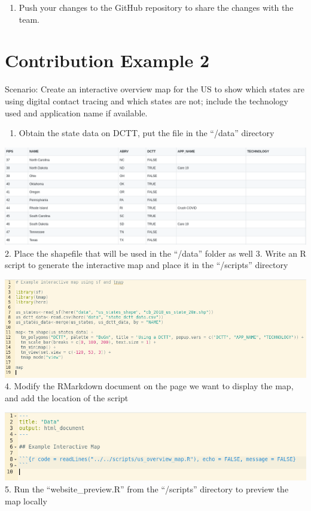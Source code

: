 \documentclass[
]{book}
\providecommand{\tightlist}{%
  \setlength{\itemsep}{0pt}\setlength{\parskip}{0pt}}
\begin{document}
\begin{enumerate}
\def\labelenumi{\arabic{enumi}.}
\setcounter{enumi}{6}
\tightlist
\item
  Push your changes to the GitHub repository to share the changes with the team.
\end{enumerate}

\hypertarget{contribution-example-2}{%
\section{Contribution Example 2}\label{contribution-example-2}}

Scenario: Create an interactive overview map for the US to show which states are using digital contact tracing and which states are not; include the technology used and application name if available.

\begin{enumerate}
\def\labelenumi{\arabic{enumi}.}
\tightlist
\item
  Obtain the state data on DCTT, put the file in the ``/data'' directory
\end{enumerate}

\includegraphics{images/04-example2_1.png}
2. Place the shapefile that will be used in the ``/data'' folder as well
3. Write an R script to generate the interactive map and place it in the ``/scripts'' directory

\includegraphics{images/04-example2_2.png}
4. Modify the RMarkdown document on the page we want to display the map, and add the location of the script

\includegraphics{images/04-example2_3.png}
5. Run the ``website\_preview.R'' from the ``/scripts'' directory to preview the map locally
\end{document}
